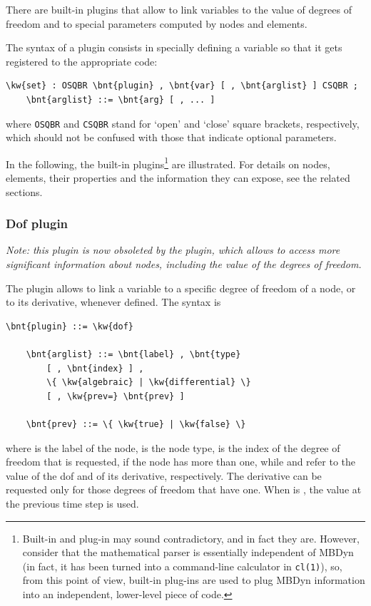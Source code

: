 There are built-in plugins that allow to link variables to the value
of degrees of freedom and to special parameters computed by nodes
and elements.

The syntax of a plugin consists in specially defining a variable
so that it gets registered to the appropriate code:
\begin{Verbatim}[commandchars=\\\{\}]
    \kw{set} : OSQBR \bnt{plugin} , \bnt{var} [ , \bnt{arglist} ] CSQBR ;
    \bnt{arglist} ::= \bnt{arg} [ , ... ]
\end{Verbatim}
where \texttt{OSQBR} and \texttt{CSQBR} stand for `open' and `close'
square brackets, respectively, which should not be confused with those
that indicate optional parameters.

In the following, the built-in plugins\footnote{Built-in and plug-in
may sound contradictory, and in fact they are.  However, consider
that the mathematical parser is essentially independent of MBDyn
(in fact, it has been turned into a command-line calculator
in \texttt{cl(1)}), so, from this point of view, built-in plug-ins
are used to plug MBDyn information into an independent, lower-level
piece of code.} are illustrated.
For details on nodes, elements, their properties and the information
they can expose, see the related sections.

\subsubsection{Dof plugin}
\emph{Note: this plugin is now obsoleted by the  plugin,
which allows to access more significant information about nodes,
including the value of the degrees of freedom.}

The  plugin allows to link a variable to a specific degree of freedom
of a node, or to its derivative, whenever defined.
The syntax is
\begin{Verbatim}[commandchars=\\\{\}]
    \bnt{plugin} ::= \kw{dof}

    \bnt{arglist} ::= \bnt{label} , \bnt{type}
        [ , \bnt{index} ] ,
        \{ \kw{algebraic} | \kw{differential} \}
        [ , \kw{prev=} \bnt{prev} ]

    \bnt{prev} ::= \{ \kw{true} | \kw{false} \}
\end{Verbatim}
where
 is the label of the node,
 is the node type,
 is the index of the degree of freedom that is requested,
if the node has more than one, while
 and  refer to the value of the dof
and of its derivative, respectively.
The derivative can be requested only for those degrees of freedom
that have one.
When  is , the value at the previous time step is used.

